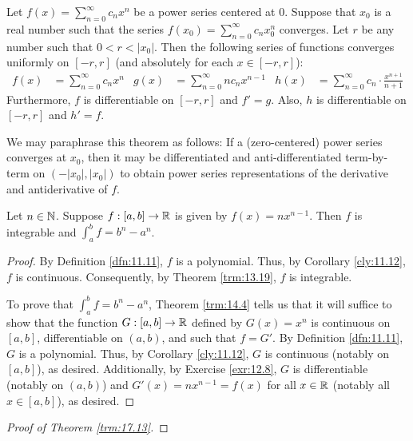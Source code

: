 \documentclass[../main.tex]{subfiles}
\begin{document}
\begin{theorem}\label{trm:17.13}
    Let $f(x)=\sum_{n=0}^\infty c_nx^n$ be a power series centered at 0. Suppose that $x_0$ is a real number such that the series $f(x_0)=\sum_{n=0}^\infty c_nx_0^n$ converges. Let $r$ be any number such that $0<r<|x_0|$. Then the following series of functions converges uniformly on $[-r,r]$ (and absolutely for each $x\in[-r,r]$):
    \begin{align*}
        f(x) &= \sum_{n=0}^\infty c_nx^n&
        g(x) &= \sum_{n=0}^\infty nc_nx^{n-1}&
        h(x) &= \sum_{n=0}^\infty c_n\cdot\frac{x^{n+1}}{n+1}
    \end{align*}
    Furthermore, $f$ is differentiable on $[-r,r]$ and $f'=g$. Also, $h$ is differentiable on $[-r,r]$ and $h'=f$.\par
    We may paraphrase this theorem as follows: If a (zero-centered) power series converges at $x_0$, then it may be differentiated and anti-differentiated term-by-term on $(-|x_0|,|x_0|)$ to obtain power series representations of the derivative and antiderivative of $f$.
    \begin{lemma*}
        Let $n\in\mathbb{N}$. Suppose $f:[a,b]\to\mathbb{R}$ is given by $f(x)=nx^{n-1}$. Then $f$ is integrable and $\int_a^bf=b^n-a^n$.
        \begin{proof}
            By Definition \ref{dfn:11.11}, $f$ is a polynomial. Thus, by Corollary \ref{cly:11.12}, $f$ is continuous. Consequently, by Theorem \ref{trm:13.19}, $f$ is integrable.\par
            To prove that $\int_a^bf=b^n-a^n$, Theorem \ref{trm:14.4} tells us that it will suffice to show that the function $G:[a,b]\to\mathbb{R}$ defined by $G(x)=x^n$ is continuous on $[a,b]$, differentiable on $(a,b)$, and such that $f=G'$. By Definition \ref{dfn:11.11}, $G$ is a polynomial. Thus, by Corollary \ref{cly:11.12}, $G$ is continuous (notably on $[a,b]$), as desired. Additionally, by Exercise \ref{exr:12.8}, $G$ is differentiable (notably on $(a,b)$) and $G'(x)=nx^{n-1}=f(x)$ for all $x\in\mathbb{R}$ (notably all $x\in[a,b]$), as desired.
        \end{proof}
    \end{lemma*}
    \begin{proof}[Proof of Theorem \ref{trm:17.13}]


\end{proof}
\end{theorem}
\end{document}
